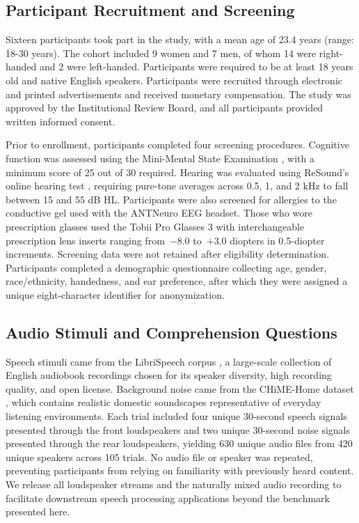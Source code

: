 \documentclass[journal]{IEEEtran}
\begin{document}
\subsection{Participant Recruitment and Screening}

Sixteen participants took part in the study, with a mean age of 23.4 years (range: 18-30 years). The cohort included 9 women and 7 men, of whom 14 were right-handed and 2 were left-handed. Participants were required to be at least 18 years old and native English speakers. Participants were recruited through electronic and printed advertisements and received monetary compensation. The study was approved by the Institutional Review Board, and all participants provided written informed consent.

Prior to enrollment, participants completed four screening procedures. Cognitive function was assessed using the Mini-Mental State Examination \cite{folstein1975mini}, with a minimum score of 25 out of 30 required. Hearing was evaluated using ReSound's online hearing test \cite{resound_hearing_test}, requiring pure-tone averages across 0.5, 1, and 2 kHz to fall between 15 and 55 dB HL. Participants were also screened for allergies to the conductive gel used with the ANTNeuro EEG headset. Those who wore prescription glasses used the Tobii Pro Glasses 3 with interchangeable prescription lens inserts ranging from~$-8.0$ to~$+3.0$ diopters in 0.5-diopter increments. Screening data were not retained after eligibility determination. Participants  completed a demographic questionnaire collecting age, gender, race/ethnicity, handedness, and ear preference, after which they were assigned a unique eight-character identifier for anonymization. 


\subsection{Audio Stimuli and Comprehension Questions}

Speech stimuli came from the LibriSpeech corpus \cite{panayotov2015librispeech}, a large-scale collection of English audiobook recordings chosen for its speaker diversity, high recording quality, and open license. Background noise came from the CHiME-Home dataset \cite{foster2015chime}, which contains realistic domestic soundscapes representative of everyday listening environments. Each trial included four unique 30-second speech signals presented through the front loudspeakers and two unique 30-second noise signals presented through the rear loudspeakers, yielding 630 unique audio files from 420 unique speakers across 105 trials. No audio file or speaker was repeated, preventing participants from relying on familiarity with previously heard content. We release all loudspeaker streams and the naturally mixed audio recording to facilitate downstream speech processing applications beyond the benchmark presented here.
\end{document}
